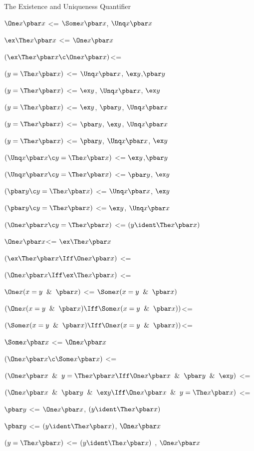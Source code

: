 The Existence and Uniqueness Quantifier
\lineb

$\One x \pbar x$ <= $\Some x \pbar x$, $\Unq x \pbar x$

$\ex \The x \pbar x$ <= $\One x \pbar x$

$(\ex \The x \pbar x \c\One x \pbar x )$<=

$(y = \The x \pbar x)$ <= $\Unq x \pbar x$, $\ex y $,$\pbar y$

$(y = \The x \pbar x)$ <= $\ex y$, $\Unq x \pbar x$, $\ex y $

$(y = \The x \pbar x)$ <= $\ex y$, $\pbar y$, $\Unq x \pbar x$

$(y = \The x \pbar x)$ <= $\pbar y$, $\ex y$, $\Unq x \pbar x$

$(y = \The x \pbar x)$ <= $\pbar y$, $\Unq x \pbar x$, $\ex y $

$(\Unq x \pbar x \c y = \The x \pbar x)$ <= $\ex y$,$\pbar y$

$(\Unq x \pbar x \c y = \The x \pbar x)$ <= $\pbar y$, $\ex y$

$(\pbar y \c y = \The x \pbar x)$ <= $\Unq x \pbar x$, $\ex y$

$(\pbar y \c y = \The x \pbar x)$ <= $\ex y$, $\Unq x \pbar x$

$(\One x \pbar x\c y = \The x \pbar x)$ <= $(y \ident \The x\pbar x)$

$\One x \pbar x $<= $\ex \The x \pbar x$

$(\ex \The x \pbar x \Iff \One x \pbar x)$ <=

$(\One x \pbar x \Iff \ex \The x \pbar x)$ <=

$\One x (x = y \And \pbar x)$ <= $\Some x (x = y \And \pbar x)$

$(\One x (x = y \And \pbar x)\Iff\Some x(x = y \And \pbar x))$<=

$(\Some x (x = y \And \pbar x)\Iff\One x(x = y \And \pbar x))$<=

$\Some x\pbar x$ <= $\One x \pbar x$ 

$(\One x \pbar x\c\Some x \pbar x)$ <= 

$(\One x\pbar x \And y = \The x \pbar x\Iff\One x\pbar x\And \pbar y \And \ex y)$ <=

$( \One x\pbar x\And \pbar y \And \ex y\Iff \One x\pbar x \And y = \The x \pbar x)$ <=

$\pbar y$ <= $\One x\pbar x $, $ (y \ident \The x \pbar x)$ 

$\pbar y$ <=  $ (y \ident \The x \pbar x)$, $\One x\pbar x $

$(y = \The x \pbar x)$ <= $ (y \ident \The x \pbar x)$ , $\One x\pbar x $

